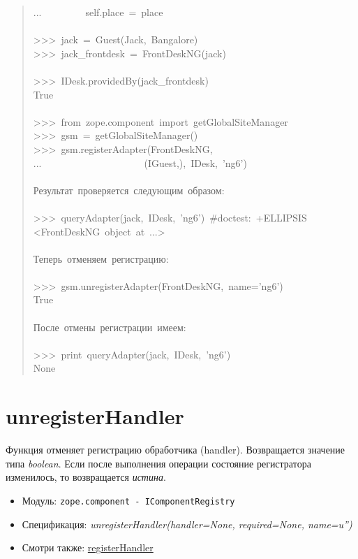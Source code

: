 \documentclass[14pt,a4paper,openany,twoside,final]{extbook}
\providecommand*{\DUroletitlereference}[1]{\textsl{#1}}
\begin{document}
\begin{quote}
{...~~~~~~~~~self.place~=~place\\
~\\
>{}>{}>~jack~=~Guest(\textquotedbl{}Jack\textquotedbl{},~\textquotedbl{}Bangalore\textquotedbl{})\\
>{}>{}>~jack\_frontdesk~=~FrontDeskNG(jack)\\
~\\
>{}>{}>~IDesk.providedBy(jack\_frontdesk)\\
True\\
~\\
>{}>{}>~from~zope.component~import~getGlobalSiteManager\\
>{}>{}>~gsm~=~getGlobalSiteManager()\\
>{}>{}>~gsm.registerAdapter(FrontDeskNG,\\
...~~~~~~~~~~~~~~~~~~~~~(IGuest,),~IDesk,~'ng6')\\
~\\
Результат~проверяется~следующим~образом:\\
~\\
>{}>{}>~queryAdapter(jack,~IDesk,~'ng6')~\#doctest:~+ELLIPSIS\\
<FrontDeskNG~object~at~...>\\
~\\
Теперь~отменяем~регистрацию:\\
~\\
>{}>{}>~gsm.unregisterAdapter(FrontDeskNG,~name='ng6')\\
True\\
~\\
После~отмены~регистрации~имеем:\\
~\\
>{}>{}>~print~queryAdapter(jack,~IDesk,~'ng6')\\
None
}
\end{quote}


\section*{unregisterHandler%
  \label{unregisterhandler}%
}

Функция отменяет регистрацию обработчика (handler). Возвращается
значение типа \DUroletitlereference{boolean}.  Если после выполнения операции состояние
регистратора изменилось, то возвращается \DUroletitlereference{истина}.

\begin{itemize}

\item Модуль: \texttt{zope.component - IComponentRegistry}

\item Спецификация: \DUroletitlereference{unregisterHandler(handler=None, required=None,
name=u'')}

\item Смотри также: \hyperref[registerhandler]{registerHandler}

\end{itemize}
\end{document}
